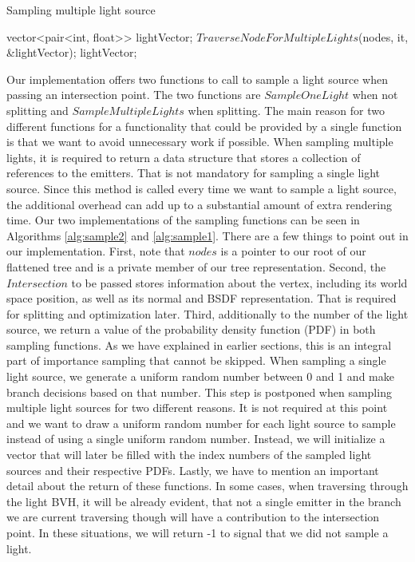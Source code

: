 	\begin{algorithm}
		\caption{Sampling multiple light source}
		\label{alg:sample2}
		\begin{algorithmic}[1] %
				\State vector<pair<int, float>> lightVector;
				\State $TraverseNodeForMultipleLights$(nodes, it, \&lightVector);
				\State \Return lightVector;
				\EndProcedure
			\end{algorithmic}
		\end{algorithm}

Our implementation offers two functions to call to sample a light source when passing an intersection point. The two functions are $SampleOneLight$ when not splitting and $SampleMultipleLights$ when splitting. The main reason for two different functions for a functionality that could be provided by a single function is that we want to avoid unnecessary work if possible. When sampling multiple lights, it is required to return a data structure that stores a collection of references to the emitters. That is not mandatory for sampling a single light source. Since this method is called every time we want to sample a light source, the additional overhead can add up to a substantial amount of extra rendering time. Our two implementations of the sampling functions can be seen in Algorithms \ref{alg:sample2} and \ref{alg:sample1}. There are a few things to point out in our implementation. First, note that $nodes$ is a pointer to our root of our flattened tree and is a private member of our tree representation. Second, the $Intersection$ to be passed stores information about the vertex, including its world space position, as well as its normal and BSDF representation. That is required for splitting and optimization later. Third, additionally to the number of the light source, we return a value of the probability density function (PDF) in both sampling functions. As we have explained in earlier sections, this is an integral part of importance sampling that cannot be skipped. When sampling a single light source, we generate a uniform random number between 0 and 1 and make branch decisions based on that number. This step is postponed when sampling multiple light sources for two different reasons. It is not required at this point and we want to draw a uniform random number for each light source to sample instead of using a single uniform random number. Instead, we will initialize a vector that will later be filled with the index numbers of the sampled light sources and their respective PDFs. Lastly, we have to mention an important detail about the return of these functions. In some cases, when traversing through the light BVH, it will be already evident, that not a single emitter in the branch we are current traversing though will have a contribution to the intersection point. In these situations, we will return -1 to signal that we did not sample a light.

